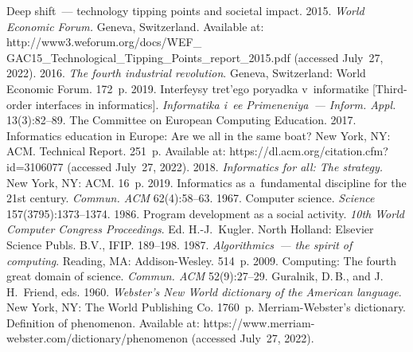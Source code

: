   \begin{multicols}{2}

\renewcommand{\bibname}{\protect\rmfamily References}

{\small\frenchspacing
 {%
 \begin{thebibliography}{99}
 Deep shift~--- technology tipping points and societal impact.   2015.
 \textit{World Economic Forum.} Geneva, 
Switzerland. Available at: {\sf 
http://www3.weforum.org/docs/WEF\_ GAC15\_Technological\_Tipping\_Points\_report\_2015.pdf} 
(accessed July~27, 2022).
 2016. \textit{The fourth industrial revolution}. Geneva, Switzerland: World Economic 
Forum. 172~p. 
 2019. {Interfeysy tret'ego poryadka v~informatike} [Third-order interfaces in 
informatics]. \textit{Informatika i~ee Primeneniya~--- Inform. Appl.} 13(3):82--89.
The Committee on European Computing Education. 2017. Informatics education in Europe: Are we all in 
the same boat? New York, NY: ACM. Technical Report. 251~p. Available at: {\sf  
https://dl.acm.org/citation.cfm? id=3106077} (accessed July~27, 2022).
 2018. \textit{Informatics for all: 
The strategy.} New York, NY: ACM. 16~p.
 2019. Informatics as 
a~fundamental discipline for the 21st century. \textit{Commun. ACM} 62(4):58--63.
 1967. Computer science. \textit{Science} 
157(3795):1373--1374.
 1986. Program development as a social activity. \textit{10th World Computer 
Congress Proceedings}. Ed. \mbox{H.-J.}~Kugler. North Holland: Elsevier Science Publs. B.V., IFIP.  
189--198.
 1987. \textit{Algorithmics~--- the spirit of computing}. Reading, MA: Addison-Wesley. 
514~p.
 2009. Computing: The fourth great domain of science. 
\textit{Commun. ACM} 52(9):27--29.
Guralnik, D.\,B., and J.\,H.~Friend, eds. 1960. \textit{Webster's New World dictionary of the American 
language}. New York, NY: The World Publishing Co. 1760~p.
{Merriam-Webster's dictionary. Definition of phenomenon}. Available at: {\sf 
https://www.merriam-webster.\linebreak com/dictionary/phenomenon} (accessed July~27, 2022).

\end{thebibliography}}}
\end{multicols}
